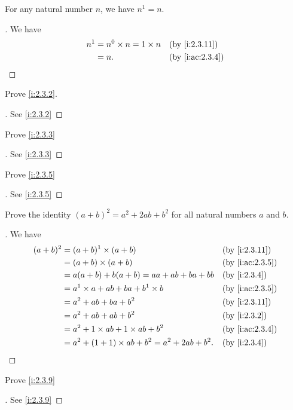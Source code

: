 \begin{ac}\label{i:ac:2.3.5}
  For any natural number \(n\), we have \(n^1 = n\).
\end{ac}

\begin{proof}[]
  We have
  \begin{align*}
    n^1 & = n^0 \times n = 1 \times n &  & \by{i:2.3.11}   \\
        & = n.                        &  & \by{i:ac:2.3.4}
  \end{align*}
\end{proof}

\exercisesection

\begin{ex}\label{i:ex:2.3.1}
  Prove \cref{i:2.3.2}.
\end{ex}

\begin{proof}[]
  See \cref{i:2.3.2}
\end{proof}

\begin{ex}\label{i:ex:2.3.2}
  Prove \cref{i:2.3.3}
\end{ex}

\begin{proof}[]
  See \cref{i:2.3.3}
\end{proof}

\begin{ex}\label{i:ex:2.3.3}
  Prove \cref{i:2.3.5}
\end{ex}

\begin{proof}[]
  See \cref{i:2.3.5}
\end{proof}

\begin{ex}\label{i:ex:2.3.4}
  Prove the identity \((a + b)^2 = a^2 + 2ab + b^2\) for all natural numbers \(a\) and \(b\).
\end{ex}

\begin{proof}[]
  We have
  \begin{align*}
    (a + b)^2 & = (a + b)^1 \times (a + b)                         &  & \by{i:2.3.11}   \\
              & = (a + b) \times (a + b)                           &  & \by{i:ac:2.3.5} \\
              & = a(a + b) + b(a + b) = aa + ab + ba + bb          &  & \by{i:2.3.4}    \\
              & = a^1 \times a + ab + ba + b^1 \times b            &  & \by{i:ac:2.3.5} \\
              & = a^2 + ab + ba + b^2                              &  & \by{i:2.3.11}   \\
              & = a^2 + ab + ab + b^2                              &  & \by{i:2.3.2}    \\
              & = a^2 + 1 \times ab + 1 \times ab + b^2            &  & \by{i:ac:2.3.4} \\
              & = a^2 + (1 + 1) \times ab + b^2 = a^2 + 2ab + b^2. &  & \by{i:2.3.4}
  \end{align*}
\end{proof}

\begin{ex}\label{i:ex:2.3.5}
  Prove \cref{i:2.3.9}
\end{ex}

\begin{proof}[]
  See \cref{i:2.3.9}
\end{proof}
